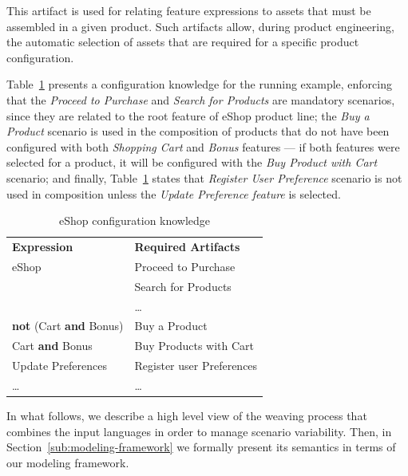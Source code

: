 \documentclass{acm_proc_article-sp}
\begin{document}
This artifact is used for relating feature expressions to assets that must be assembled in a given product. Such artifacts allow, during product engineering, the automatic selection of assets that are required for a specific product configuration. 

Table~\ref{tab:ck-running-example} presents a configuration knowledge 
for the running example, enforcing that the \emph{Proceed to Purchase} and 
\emph{Search for Products} are mandatory scenarios, since they are related 
to the root feature of eShop product line;  
the \emph{Buy a Product} scenario is used in the composition of products that do not have been configured with both \emph{Shopping Cart} and \emph{Bonus} features --- if both features were selected for a product, it will be configured with the \emph{Buy Product with Cart} scenario; and finally, Table~\ref{tab:ck-running-example} states that \emph{Register User Preference} scenario is not used in composition unless the \emph{Update Preference feature} is selected.


\begin{table}[th]
\begin{center}
\caption{eShop configuration knowledge} \label{tab:ck-running-example}
\begin{tabular}{ll}
   \hline\noalign{\smallskip}
  {\bf Expression} & {\bf Required Artifacts} \\
   \noalign{\smallskip}
   \hline
   \noalign{\smallskip}
    eShop & Proceed to Purchase \\
               & Search for Products \\
               & \ldots \\ 
    {\bf not} (Cart {\bf and} Bonus)\hspace{2pt} & Buy a Product \\ 
    Cart {\bf and} Bonus & Buy Products with Cart \\ 
    Update Preferences & Register user Preferences	 \\  
    \ldots & \ldots \\ 
  \hline
\end{tabular}
\end{center}
\end{table}

In what follows, we describe a high level view of the weaving process that combines the input languages in order to manage scenario variability.  Then, in Section~\ref{sub:modeling-framework} we formally present its semantics in terms of our modeling framework. 
\end{document}
